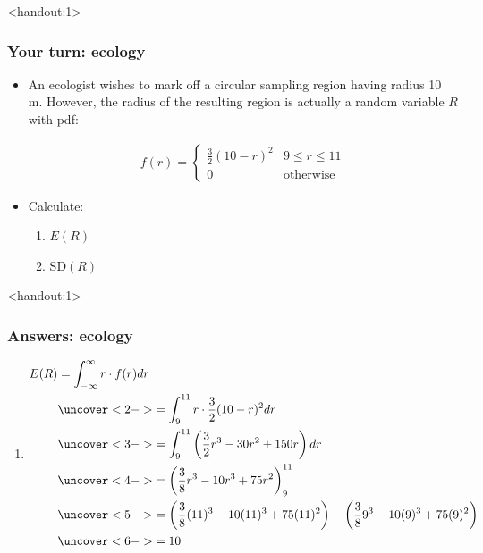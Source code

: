\documentclass[handout]{beamer}\usepackage[]{graphicx}\usepackage[]{color}
\newcommand{\answers}{1}
\numberwithin{equation}{section}
\begin{document}
\begin{frame}<handout:\answers>
\frametitle{Your turn: ecology}
\begin{itemize}
\item An ecologist wishes to mark off a circular sampling region having radius 10 m. However, the radius of the resulting region is actually a random variable $R$ with pdf:
\begin{center}
\begin{align*}
f(r) = \begin{cases}
\frac{3}{2} (10 - r)^2 & 9 \le r \le 11 \\
0 & \text{otherwise}
\end{cases}
\end{align*}
\end{center}
\item Calculate:
\begin{enumerate}[1. ]
\item $E(R)$
\item SD$(R)$
\end{enumerate}
\end{itemize}
\end{frame}

\begin{frame}<handout:\answers>
\frametitle{Answers: ecology} \scriptsize
\begin{enumerate}[1. ]
\item 
\begin{align*}
E(R) &= \int_{-\infty}^\infty r \cdot f(r) dr \\
&\uncover<2->{= \int_9^{11} r \cdot \frac{3}{2} (10 - r)^2 dr} \\
&\uncover<3->{= \int_{9}^{11} \left (\frac{3}{2} r^3 - 30 r^2+ 150 r \right ) dr} \\
&\uncover<4->{= \left (\frac{3}{8} r^3 - 10 r^3 + 75 r^2 \right )_9^{11}} \\
&\uncover<5->{= \left (\frac{3}{8} (11)^3 - 10 (11)^3 + 75 (11)^2 \right ) - \left (\frac{3}{8} 9^3 - 10 (9) ^3 + 75 (9)^2 \right)} \\
&\uncover<6->{= 10}
\end{align*}
\end{enumerate}
\end{frame}
\end{document}
